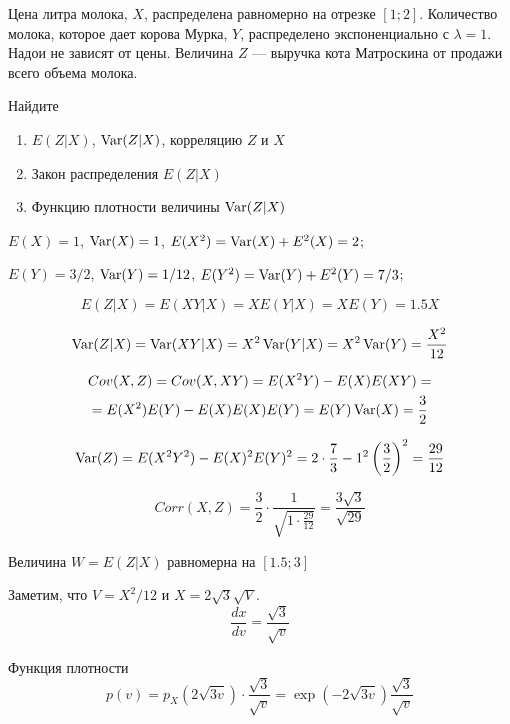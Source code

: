\begin{problem}
Цена литра молока, $X$, распределена равномерно на отрезке $[1;2]$. Количество молока, которое дает корова Мурка, $Y$, распределено экспоненциально с $\lambda=1$. Надои не зависят от цены. Величина $Z$ --- выручка кота Матроскина от продажи всего объема молока.

Найдите
\begin{enumerate}
\item $E(Z|X)$, $\operatorname{Var}(Z|X)$, корреляцию $Z$ и $X$
\item Закон распределения $E(Z|X)$
\item Функцию плотности величины $\operatorname{Var}(Z|X)$
\end{enumerate}
\end{problem} 
\begin{solution} 
 $E(X)=1$, $\operatorname{Var}(X)=1$, $E(X^2)=\operatorname{Var}(X)+E^2(X)=2$; 

$E(Y)=3/2$, $\operatorname{Var}(Y)=1/12$, $E(Y^2)=\operatorname{Var}(Y)+E^2(Y)=7/3$;

\begin{equation}
E(Z|X)=E(XY|X)=XE(Y|X)=XE(Y)=1.5X
\end{equation}

\begin{equation}
\operatorname{Var}(Z|X)=\operatorname{Var}(XY|X)=X^2\operatorname{Var}(Y|X)=X^2\operatorname{Var}(Y)=\frac{X^2}{12}
\end{equation}

\begin{multline}
Cov(X,Z)=Cov(X,XY)=E(X^2Y)-E(X)E(XY)=\\
=E(X^2)E(Y)-E(X)E(X)E(Y)=E(Y)\operatorname{Var}(X)=\frac{3}{2}
\end{multline}

\begin{equation}
\operatorname{Var}(Z)=E(X^2Y^2)-E(X)^2E(Y)^2=2\cdot \frac{7}{3}-1^2\left(\frac{3}{2}\right)^2=\frac{29}{12}
\end{equation}

\begin{equation}
Corr(X,Z)=\frac{3}{2}\cdot \frac{1}{\sqrt{1\cdot \frac{29}{12}}}=\frac{3\sqrt{3}}{\sqrt{29}}
\end{equation}

Величина $W=E(Z|X)$ равномерна на $[1.5;3]$

Заметим, что $V=X^{2}/12$ и $X=2\sqrt{3}\sqrt{V}$.
\begin{equation}
\frac{dx}{dv}=\frac{\sqrt{3}}{\sqrt{v}}
\end{equation}

Функция плотности
\begin{equation}
p(v)=p_{X}\left(2\sqrt{3v}\right)\cdot \frac{\sqrt{3}}{\sqrt{v}}=\exp\left(-2\sqrt{3v}\right)\frac{\sqrt{3}}{\sqrt{v}}
\end{equation} 
\end{solution}

